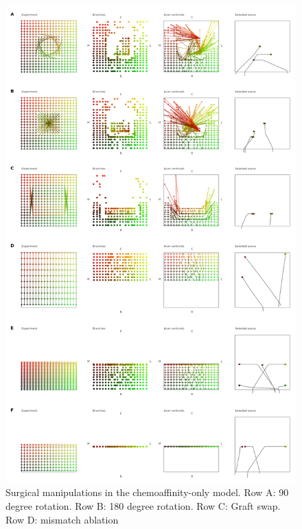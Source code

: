 \documentclass[11pt, a4paper]{article}
\begin{document}
%
%
\begin{figure}
\includegraphics[width=0.8\linewidth]{./images/fig_chemo_manipulations.png}
\caption{Surgical manipulations in the chemoaffinity-only model. Row A: 90 degree
rotation. Row B: 180 degree rotation. Row C: Graft swap. Row D: mismatch ablation}
\label{f:chsurg}
\end{figure}
\end{document}
